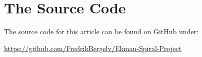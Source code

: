 \appendix
\section{The Source Code}
The source code for this article can be found on GitHub under:
\begin{center}
\url{https://github.com/FredrikBergelv/Ekman-Spiral-Project}
\end{center}


